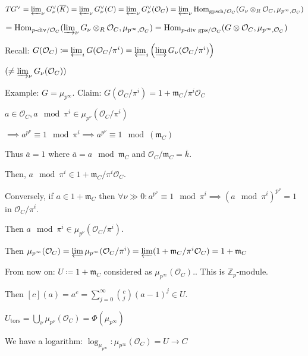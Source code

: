 \documentclass{article}
\theoremstyle{definition}
\numberwithin{theorem}{subsection}
\begin{document}
    \(T G^\vee = \varprojlim_\nu G_\nu^\vee(\overline{K}) = \varprojlim_\nu G_\nu^\vee(C) = \varprojlim_\nu G_\nu^\vee(\mathcal{O}_C) = \varprojlim_\nu \operatorname{Hom}_{\text{gpsch} / \mathcal{O}_C}(G_\nu \otimes_R \mathcal{O}_C, \mu_{p^{\infty}, \mathcal{O}_C})\)
    
    \(= \operatorname{Hom}_{p \text{-div} / \mathcal{O}_C} (\varinjlim_\nu G_\nu \otimes_R \mathcal{O}_C, \mu_{p^{\infty}, \mathcal{O}_C}) = \operatorname{Hom}_{p \text{-div gps} / \mathcal{O}_C} (G \otimes \mathcal{O}_C, \mu_{p^{\infty}, \mathcal{O}_C})\) 
    

    Recall: \(G(\mathcal{O}_C) \coloneqq \varprojlim_i G(\mathcal{O}_C / \pi^i) = \varprojlim_i \left( \varinjlim G_\nu(\mathcal{O}_C / \pi^i) \right) \) 

    \((\neq \varinjlim_\nu G_\nu(\mathcal{O}_C))\)
    
    Example: \(G = \mu_{p^{\infty}}\). Claim: \(G(\mathcal{O}_C / \pi^i) = 1 + \mathfrak{m}_C / \pi^i \mathcal{O}_C\)

    \(a\in \mathcal{O}_C, a \mod \pi^i \in \mu_{p^\nu}(\mathcal{O}_C / \pi^i)\)
    
    \(\implies a^{p^\nu} \equiv 1\mod \pi^i \implies a^{p^\nu} \equiv  1 \mod(\mathfrak{m}_C)\)
    
    Thus \(\overline{a} = 1\) where \(\overline{a} = a \mod \mathfrak{m}_C\) and \(\mathcal{O}_C / \mathfrak{m}_C = \overline{k}\).

    Then, \(a \mod \pi^i \in 1 + \mathfrak{m}_C / \pi^i \mathcal{O}_C\).

    Conversely, if \(a \in 1 + \mathfrak{m}_C\) then \(\forall \nu \gg 0: a^{p^\nu} \equiv 1 \mod{\pi^i} \implies (a\mod\pi^i)^{p^\nu} = 1\) in \(\mathcal{O}_C / \pi^i\).
    
    Then \(a \mod \pi^i \in \mu_{p^\nu}(\mathcal{O}_C / \pi^i)\).

    Then \(\mu_{p^{\infty}}(\mathcal{O}_C) = \varprojlim \mu_{p^{\infty}}(\mathcal{O}_C / \pi^i) = \varprojlim (1+ \mathfrak{m}_C / \pi^i \mathcal{O}_C) = 1 + \mathfrak{m}_C\)
    
    From now on: \(U \coloneqq 1 + \mathfrak{m}_C\) considered as \(\mu_{p^{\infty}}(\mathcal{O}_C).\). This is \(\mathbb{Z}_p\)-module. 

    Then \([c](a) = a^c = \sum_{j=0}^{\infty} \binom{c}{j} (a-1)^j \in U\). 

    \(U_{\text{tors}} = \bigcup_\nu \mu_{p^\nu}(\mathcal{O}_C) = \Phi(\mu_{p^{\infty}})\) 

    We have a logarithm: \(\log_{\mu_{p^{\infty}}} : \mu_{p^{\infty}}(\mathcal{O}_C) = U \to C\) 
\end{document}
